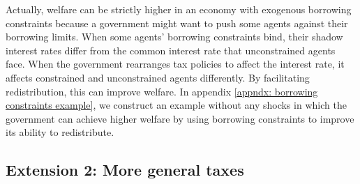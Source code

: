 \documentclass[thmsb,11pt]{article}
\begin{document}
Actually, welfare can  be strictly higher in an economy  with exogenous
borrowing constraints  because  a government might want to
push some agents against their borrowing limits. When some agents' borrowing
constraints bind, their shadow interest rates differ from the
common interest rate that unconstrained agents face. When the government rearranges tax
policies to  affect the  interest rate, it affects constrained and unconstrained agents
 differently.  By facilitating
redistribution, this can improve welfare. %
In appendix \ref{appndx: borrowing constraints example}, we construct an example without any
shocks in which the government can achieve higher welfare by using borrowing
constraints to improve its ability to redistribute.
\subsection{Extension 2: More general taxes \label{Sec: extensions-NDPF}}
\end{document}
